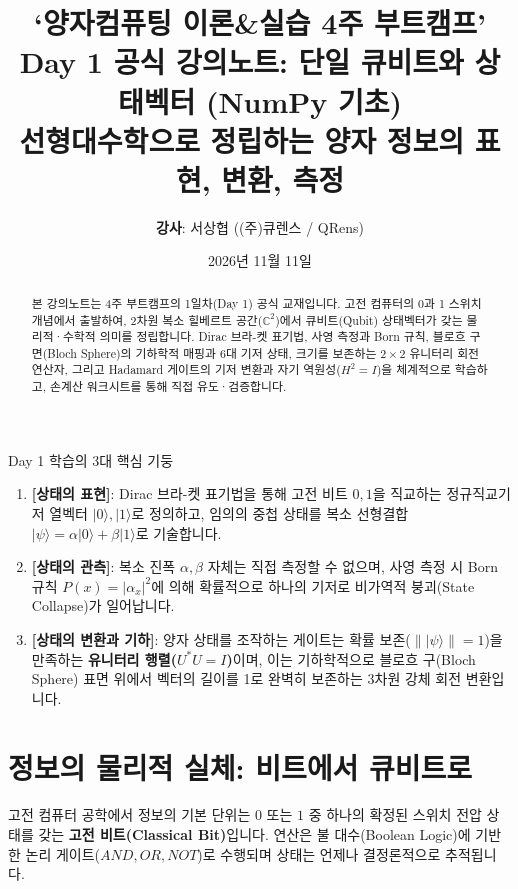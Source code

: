 \documentclass[11pt, a4paper]{article}
\title{\textbf{\Huge ‘양자컴퓨팅 이론\&실습 4주 부트캠프’}\\[0.4em]
\LARGE Day 1 공식 강의노트: 단일 큐비트와 상태벡터 (NumPy 기초)\\[0.2em]
\large 선형대수학으로 정립하는 양자 정보의 표현, 변환, 측정}
\author{\textbf{강사}: 서상협 ((주)큐렌스 / QRens)}
\date{2026년 11월 11일}
\newcommand{\ket}[1]{|#1\rangle}
\theoremstyle{definition}
\begin{document}
\maketitle

\begin{abstract}
본 강의노트는 4주 부트캠프의 1일차(Day 1) 공식 교재입니다. 고전 컴퓨터의 0과 1 스위치 개념에서 출발하여, 2차원 복소 힐베르트 공간($\mathbb{C}^2$)에서 큐비트(Qubit) 상태벡터가 갖는 물리적·수학적 의미를 정립합니다. Dirac 브라-켓 표기법, 사영 측정과 Born 규칙, 블로흐 구면(Bloch Sphere)의 기하학적 매핑과 6대 기저 상태, 크기를 보존하는 $2 \times 2$ 유니터리 회전 연산자, 그리고 Hadamard 게이트의 기저 변환과 자기 역원성($H^2=I$)을 체계적으로 학습하고, 손계산 워크시트를 통해 직접 유도·검증합니다.
\end{abstract}

\vspace{0.3cm}

\begin{notebox}{Day 1 학습의 3대 핵심 기둥}
\begin{enumerate}
    \item \textbf{[상태의 표현]}: Dirac 브라-켓 표기법을 통해 고전 비트 $0, 1$을 직교하는 정규직교기저 열벡터 $\ket{0}, \ket{1}$로 정의하고, 임의의 중첩 상태를 복소 선형결합 $\ket{\psi} = \alpha\ket{0} + \beta\ket{1}$로 기술합니다.
    \item \textbf{[상태의 관측]}: 복소 진폭 $\alpha, \beta$ 자체는 직접 측정할 수 없으며, 사영 측정 시 Born 규칙 $P(x) = |\alpha_x|^2$에 의해 확률적으로 하나의 기저로 비가역적 붕괴(State Collapse)가 일어납니다.
    \item \textbf{[상태의 변환과 기하]}: 양자 상태를 조작하는 게이트는 확률 보존($\|\ket{\psi}\|=1$)을 만족하는 \textbf{유니터리 행렬($U^* U = I$)}이며, 이는 기하학적으로 블로흐 구(Bloch Sphere) 표면 위에서 벡터의 길이를 1로 완벽히 보존하는 3차원 강체 회전 변환입니다.
\end{enumerate}
\end{notebox}

\section{정보의 물리적 실체: 비트에서 큐비트로}
고전 컴퓨터 공학에서 정보의 기본 단위는 $0$ 또는 $1$ 중 하나의 확정된 스위치 전압 상태를 갖는 \textbf{고전 비트(Classical Bit)}입니다. 연산은 불 대수(Boolean Logic)에 기반한 논리 게이트($AND, OR, NOT$)로 수행되며 상태는 언제나 결정론적으로 추적됩니다.
\end{document}
